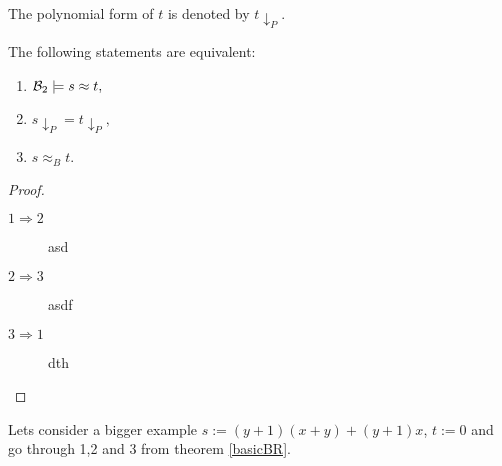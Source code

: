 	The polynomial form of $t$ is denoted by $t{\downarrow_P}$.
	\begin{theorem}\label{basicBR}
		The following statements are equivalent:
		\begin{enumerate}
			\item ${\mathcal{B}_2}\models s\approx t,$
			\item $s{\downarrow_P}=t{\downarrow_P},$
			\item $s\approx_B t.$
		\end{enumerate}
	\end{theorem}
	\begin{proof}\mbox{}
		\begin{description}
			\item[$1\Rightarrow 2$] asd
			\item[$2\Rightarrow 3$] asdf
			\item[$3\Rightarrow 1$] dth
		\end{description}
	\end{proof}
	Lets consider a bigger example $s:=(y+1)(x+y)+(y+1)x$, $t:=0$ and go through 1,2 and 3 from theorem \ref{basicBR}.
